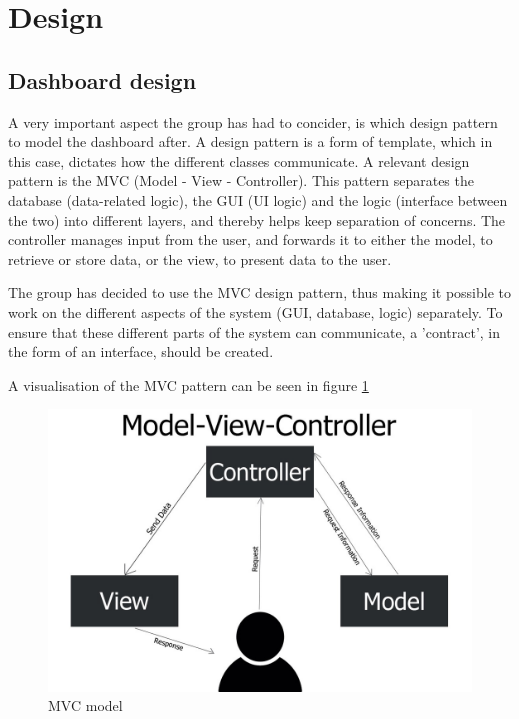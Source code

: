 \section{Design}

\subsection{Dashboard design}
A very important aspect the group has had to concider, is which design pattern
to model the dashboard after. A design pattern is a form of template, which in
this case, dictates how the different classes communicate. A relevant design
pattern is the MVC (Model - View - Controller). This pattern separates the
database (data-related logic), the GUI (UI logic) and the logic (interface
between the two) into different layers, and thereby helps keep separation of
concerns. The controller manages input from the user, and forwards it to either
the model, to retrieve or store data, or the view, to present data to the user.

The group has decided to use the MVC design pattern, thus making it possible to
work on the different aspects of the system (GUI, database, logic) separately.
To ensure that these different parts of the system can communicate, a
'contract', in the form of an interface, should be created.

A visualisation of the MVC pattern can be seen in figure \ref{figure:MVC_model}
\begin{figure}[ht]
    \centering
    \includegraphics[scale=1]{images/MVC_model.jpg}
    \caption{MVC model}
    \label{figure:MVC_model}
\end{figure}